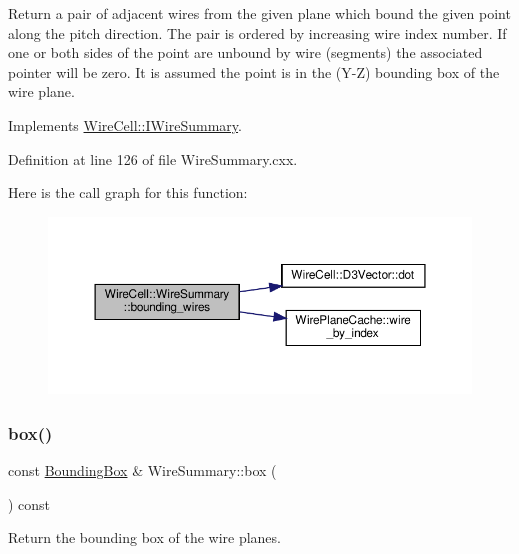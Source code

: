 Return a pair of adjacent wires from the given plane which bound the given point along the pitch direction. The pair is ordered by increasing wire index number. If one or both sides of the point are unbound by wire (segments) the associated pointer will be zero. It is assumed the point is in the (Y-\/Z) bounding box of the wire plane. 

Implements \hyperlink{class_wire_cell_1_1_i_wire_summary_a13c8567121a0ab3dc34f402eddd5f718}{Wire\+Cell\+::\+I\+Wire\+Summary}.



Definition at line 126 of file Wire\+Summary.\+cxx.

Here is the call graph for this function\+:
\nopagebreak
\begin{figure}[H]
\begin{center}
\leavevmode
\includegraphics[width=350pt]{class_wire_cell_1_1_wire_summary_a0dd41ce408d6cf49e923a1bd0a893038_cgraph}
\end{center}
\end{figure}
\mbox{\label{class_wire_cell_1_1_wire_summary_aeb12de01cfc6a14c8745100e5bef3e3d}} 
\subsubsection{\texorpdfstring{box()}{box()}}
{\footnotesize\ttfamily const \hyperlink{class_wire_cell_1_1_bounding_box}{Bounding\+Box} \& Wire\+Summary\+::box (\begin{DoxyParamCaption}{ }\end{DoxyParamCaption}) const\hspace{0.3cm}{\ttfamily [virtual]}}



Return the bounding box of the wire planes. 



